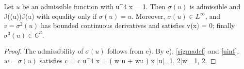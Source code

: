 \begin{lemma} Let $u$ be an admissible function with
    \be\label{uint} \intrrr u^4 \diff x = 1. \ee
    Then $\sigma(u)$ is admissible and
    \be\label{jineq} J\left(\sigma(u)\right)\leq J(u) \ee
    with equality only if $\sigma(u) = u$. Moreover, $\sigma(u) \in L^\infty$,
    and $v=\sigma^2(u)$ has bounded continuous derivatives and satisfies
    \be\label{vlim}  v(x) = 0;\ee
    finally $\sigma^3(u) \in C^2$.
\end{lemma}
\begin{proof}
The admissibility of $\sigma(u)$ follows from e). By e), \eqref{sigmadef} and
\eqref{uint}, $w=\sigma(u)$ satisfies
\be \label{cineq} c = c \intrrr u^4 \diff x = \intrrr \left( \grad w \cdot \grad
u + wu \right) \diff x \leq |u|_{1, 2}|w|_{1, 2}. \ee

\end{proof}





